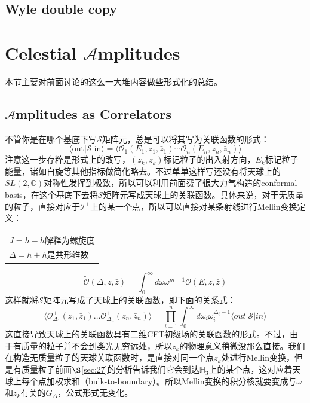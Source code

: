 \subsection{Wyle double copy}
\section{Celestial $\mathcal{A}$mplitudes}
本节主要对前面讨论的这么一大堆内容做些形式化的总结。
\subsection{$\mathcal{A}$mplitudes as Correlators}
不管你是在哪个基底下写$\mathcal{S}$矩阵元，总是可以将其写为关联函数的形式：
\begin{equation}
	\boxed{
		\langle\text{out}|\mathcal{S}|\text{in}\rangle=\langle\mathcal{O}_1(E_1,z_1,\bar{z}_1)\cdots\mathcal{O}_n(E_n,z_n,\bar{z}_n)\rangle
	}
\end{equation}
注意这一步存粹是形式上的改写，$(z_k,\bar z_k)$标记粒子的出入射方向，$E_k$标记粒子能量，诸如自旋等其他指标做简化略去。不过单单这样写还没有将天球上的$SL(2,\mathbb{C})$对称性发挥到极致，所以可以利用前面费了很大力气构造的conformal basis，在这个基底下去将$\mathcal{S}$矩阵元写成天球上的关联函数。具体来说，对于无质量的粒子，直接对应于$\mathcal{I}^\pm$上的某一个点，所以可以直接对某条射线进行Mellin变换定义：\begin{margintable}\footnotesize 
	\begin{tabularx}{\marginparwidth}{|X}
		$J=h-\bar h$解释为螺旋度\\
		$\Delta = h+\bar h$是共形维数\\
	\end{tabularx}
\end{margintable}
\begin{equation}
	\tilde{\mathcal{O}}(\Delta,z,\bar{z})=\int_0^\infty d\omega\omega^{m-1}\mathcal{O}(E,z,\bar{z})
\end{equation}
这样就将$\mathcal{S}$矩阵元写成了天球上的关联函数，即下面的关系式：
\begin{equation}
	\boxed{
		\langle\mathcal{O}_{\Delta_1}^{\pm}(z_1,\bar{z}_1)\ldots\mathcal{O}_{\Delta_n}^{\pm}(z_n,\bar{z}_n)\rangle=\prod_{i=1}^{n}\int_0^{\infty}d\omega_i\omega_i^{\Delta_i-1}\langle out|\mathcal{S}|in\rangle 
	}
\end{equation}
这直接导致天球上的关联函数具有二维CFT初级场的关联函数的形式。不过，由于有质量的粒子并不会到类光无穷远处，所以$z_k$的物理意义稍微没那么直接。我们在构造无质量粒子的天球关联函数时，是直接对同一个点$z_k$处进行Mellin变换，但是有质量粒子前面$\S $\ref{sec:27}的分析告诉我们它会到达$\mathbb{H}_3$上的某个点，这对应着天球上每个点加权求和（bulk-to-boundary）。所以Mellin变换的积分核就要变成与$\omega$和$z_k$有关的$G_\Delta$，公式形式无变化。
